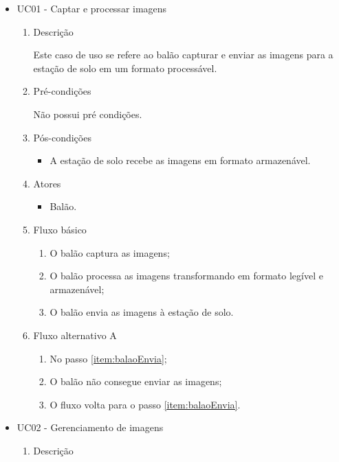 \begin{itemize}
	\item UC01 - Captar e processar imagens
		\begin{enumerate}
			\item Descrição

				Este caso de uso se refere ao balão capturar e enviar as imagens para a estação de solo em um formato processável.

			\item Pré-condições

				Não possui pré condições.

			\item Pós-condições
				\begin{itemize}
					\item A estação de solo recebe as imagens em formato armazenável.
				\end{itemize}

			\item Atores
				\begin{itemize}
					\item Balão.
				\end{itemize}


			\item Fluxo básico
				\begin{enumerate}
					\item O balão captura as imagens;
					\item O balão processa as imagens transformando em formato legível e armazenável;
					\item O balão envia as imagens à estação de solo.
					\label{item:balaoEnvia}
				\end{enumerate}

			\item Fluxo alternativo A
				\begin{enumerate}
					\item No passo \ref{item:balaoEnvia};
					\item O balão não consegue enviar as imagens;
					\item O fluxo volta para o passo \ref{item:balaoEnvia}.
				\end{enumerate}
		\end{enumerate}

		\item UC02 - Gerenciamento de imagens
			\begin{enumerate}
				\item Descrição


\end{enumerate}
\end{itemize}
